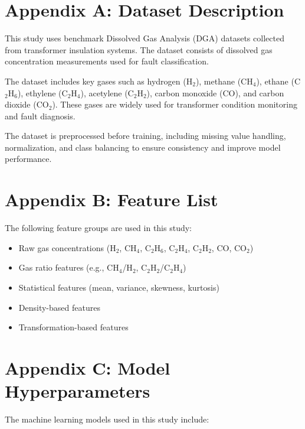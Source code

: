 \renewcommand\listtablename{\normalsize\normalfont\centering\vspace*{-0.5 in} APPENDICES}

\iftablespage
{}
{}

\section{Appendix A: Dataset Description}

This study uses benchmark Dissolved Gas Analysis (DGA) datasets collected from transformer insulation systems. The dataset consists of dissolved gas concentration measurements used for fault classification.

The dataset includes key gases such as hydrogen (H$_2$), methane (CH$_4$), ethane (C$_2$H$_6$), ethylene (C$_2$H$_4$), acetylene (C$_2$H$_2$), carbon monoxide (CO), and carbon dioxide (CO$_2$). These gases are widely used for transformer condition monitoring and fault diagnosis.

The dataset is preprocessed before training, including missing value handling, normalization, and class balancing to ensure consistency and improve model performance.

\section{Appendix B: Feature List}

The following feature groups are used in this study:

\begin{itemize}
\item Raw gas concentrations (H$_2$, CH$_4$, C$_2$H$_6$, C$_2$H$_4$, C$_2$H$_2$, CO, CO$_2$)
\item Gas ratio features (e.g., CH$_4$/H$_2$, C$_2$H$_2$/C$_2$H$_4$)
\item Statistical features (mean, variance, skewness, kurtosis)
\item Density-based features
\item Transformation-based features
\end{itemize}

\section{Appendix C: Model Hyperparameters}

The machine learning models used in this study include:

